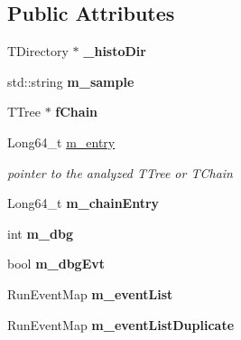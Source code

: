 \subsection*{Public Attributes}
\begin{DoxyCompactItemize}
\item 
\hypertarget{classToyNtAna_a48efee8b94cd3473d15a06112283d8fc}{
TDirectory $\ast$ {\bfseries \_\-histoDir}}
\label{classToyNtAna_a48efee8b94cd3473d15a06112283d8fc}

\item 
\hypertarget{classToyNtAna_a3a86332be1a416d60d98d08a4b2bed40}{
std::string {\bfseries m\_\-sample}}
\label{classToyNtAna_a3a86332be1a416d60d98d08a4b2bed40}

\item 
\hypertarget{classToyNtAna_a4fcfcb1348348b66e9b34bbdb6a6f31b}{
TTree $\ast$ {\bfseries fChain}}
\label{classToyNtAna_a4fcfcb1348348b66e9b34bbdb6a6f31b}

\item 
\hypertarget{classToyNtAna_a6e6fd06c5edc8e6103bd10f37f6a7923}{
Long64\_\-t \hyperlink{classToyNtAna_a6e6fd06c5edc8e6103bd10f37f6a7923}{m\_\-entry}}
\label{classToyNtAna_a6e6fd06c5edc8e6103bd10f37f6a7923}

\begin{DoxyCompactList}\small\item\em pointer to the analyzed TTree or TChain \item\end{DoxyCompactList}\item 
\hypertarget{classToyNtAna_a44208eb30829347946ed7d181710f48d}{
Long64\_\-t {\bfseries m\_\-chainEntry}}
\label{classToyNtAna_a44208eb30829347946ed7d181710f48d}

\item 
\hypertarget{classToyNtAna_a0081d718751266dd0fa300a3b8308759}{
int {\bfseries m\_\-dbg}}
\label{classToyNtAna_a0081d718751266dd0fa300a3b8308759}

\item 
\hypertarget{classToyNtAna_a74045c61c388ed5ca2b622f82a1a6c1c}{
bool {\bfseries m\_\-dbgEvt}}
\label{classToyNtAna_a74045c61c388ed5ca2b622f82a1a6c1c}

\item 
\hypertarget{classToyNtAna_a1f4d3740885c1233f1675710e0e4a543}{
RunEventMap {\bfseries m\_\-eventList}}
\label{classToyNtAna_a1f4d3740885c1233f1675710e0e4a543}

\item 
\hypertarget{classToyNtAna_a116a6e87d5e483e61caa62b9a44ef447}{
RunEventMap {\bfseries m\_\-eventListDuplicate}}
\label{classToyNtAna_a116a6e87d5e483e61caa62b9a44ef447}


\end{DoxyCompactItemize}

